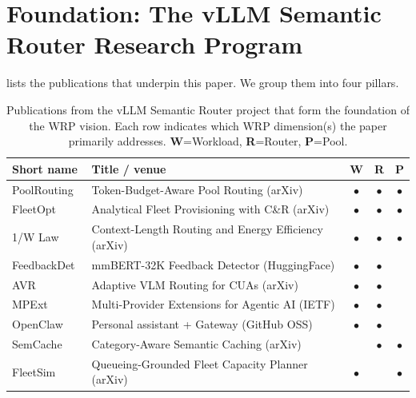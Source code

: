 \section{Foundation: The vLLM Semantic Router Research Program}
\label{sec:foundation}

 lists the publications that underpin this paper.
We group them into four pillars.

\begin{table}[t]
\centering
\caption{Publications from the vLLM Semantic Router project that
form the foundation of the WRP vision.  Each row indicates which WRP
dimension(s) the paper primarily addresses.
\textbf{W}=Workload, \textbf{R}=Router, \textbf{P}=Pool.}
\label{tab:ownwork}
\small
\renewcommand{\arraystretch}{1.15}
\begin{tabularx}{\textwidth}{l X c c c}
\toprule
\textbf{Short name} & \textbf{Title / venue} & \textbf{W} & \textbf{R} & \textbf{P} \\
\midrule
\rowcolor{lightgray}
PoolRouting~\cite{poolrouting2026}
  & Token-Budget-Aware Pool Routing (arXiv) & $\bullet$ & $\bullet$ & $\bullet$ \\
FleetOpt~\cite{fleetopt2026}
  & Analytical Fleet Provisioning with C\&R (arXiv) & $\bullet$ & $\bullet$ & $\bullet$ \\
\rowcolor{lightgray}
1/W Law~\cite{onewlaw2026}
  & Context-Length Routing and Energy Efficiency (arXiv) & $\bullet$ & $\bullet$ & $\bullet$ \\
\midrule
FeedbackDet~\cite{feedbackdet2026}
  & mmBERT-32K Feedback Detector (HuggingFace) & $\bullet$ & $\bullet$ &  \\
\rowcolor{lightgray}
AVR~\cite{avr2026}
  & Adaptive VLM Routing for CUAs (arXiv) & $\bullet$ & $\bullet$ &  \\
MPExt~\cite{mpext2025}
  & Multi-Provider Extensions for Agentic AI (IETF) & $\bullet$ & $\bullet$ &  \\
\rowcolor{lightgray}
OpenClaw~\cite{openclaw2026}
  & Personal assistant + Gateway (GitHub OSS) & $\bullet$ & $\bullet$ &  \\
SemCache~\cite{wang2025cache}
  & Category-Aware Semantic Caching (arXiv) &  & $\bullet$ & $\bullet$ \\
FleetSim~\cite{fleetsim2026}
  & Queueing-Grounded Fleet Capacity Planner (arXiv) & $\bullet$ &  & $\bullet$ \\

\end{tabularx}
\end{table}
